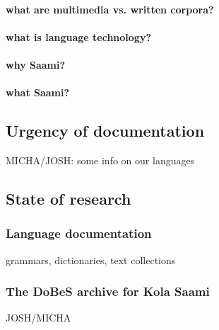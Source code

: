 \documentclass[a4paper,12pt]{article}
\begin{document}
\paragraph{what are multimedia vs. written corpora?}

\paragraph{what is language technology?}

\paragraph{why Saami?}

\paragraph{what Saami?}

\subsection{Urgency of documentation}
MICHA/JOSH: some info on our languages  

\subsection{State of research}
\subsubsection{Language documentation}
grammars, dictionaries, text collections

\subsubsection{The DoBeS archive for Kola Saami}
JOSH/MICHA
\end{document}
